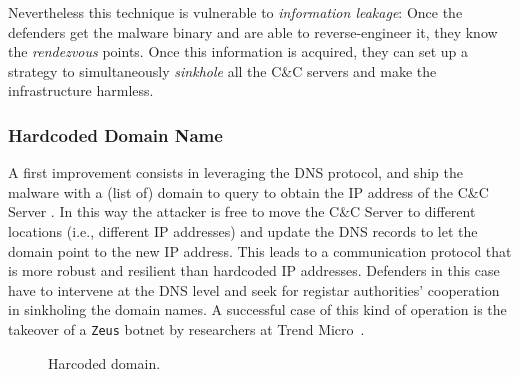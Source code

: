 Nevertheless this technique is vulnerable to \emph{information leakage}: Once the
defenders get the malware binary and are able to reverse-engineer it, they know
the \emph{rendezvous} points. Once this information is acquired, they can set up
a strategy to simultaneously \emph{sinkhole} all the C\&C servers and make the
infrastructure harmless.


\subsubsection{Hardcoded Domain Name} %
\label{ssub:hardcoded_domain_name}
A first improvement consists in leveraging the DNS protocol, and ship the malware
with a (list of) domain to query to obtain the IP address of the
C\&C Server \cite{schiavoni2013}. In this way the attacker is free to move the
C\&C Server to different locations (i.e., different IP addresses) and update the
DNS records to let the domain point to the new IP address. This leads to a
communication protocol that is more robust and resilient than hardcoded IP addresses. Defenders in this case have to intervene at the
DNS level and seek for registar authorities' cooperation in sinkholing the
domain names. A successful case of this kind of operation is the takeover of a \texttt{Zeus} botnet by
researchers at Trend Micro~\cite{micro2011}.

\begin{figure}[!htp]
\centering
{}
\caption{Harcoded domain.}
\label{fig:hardcoded_domain}
\end{figure}

